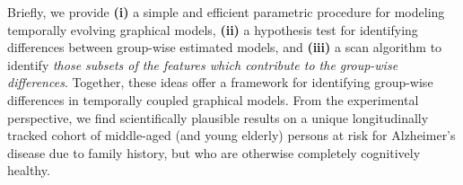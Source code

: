 Briefly, we provide \textbf{(i)} a simple and efficient parametric procedure for modeling temporally evolving graphical models, \textbf{(ii)} a 
hypothesis test for identifying differences between group-wise estimated models, and \textbf{(iii)} a scan
algorithm to identify {\em those subsets of the features which contribute to the group-wise differences}.
Together, these ideas offer a framework for identifying group-wise differences in temporally coupled graphical models.
From the experimental perspective, we find scientifically plausible results on 
a unique longitudinally tracked cohort of middle-aged (and young elderly) persons at risk for Alzheimer's disease due to family history, 
but who are otherwise completely cognitively healthy.